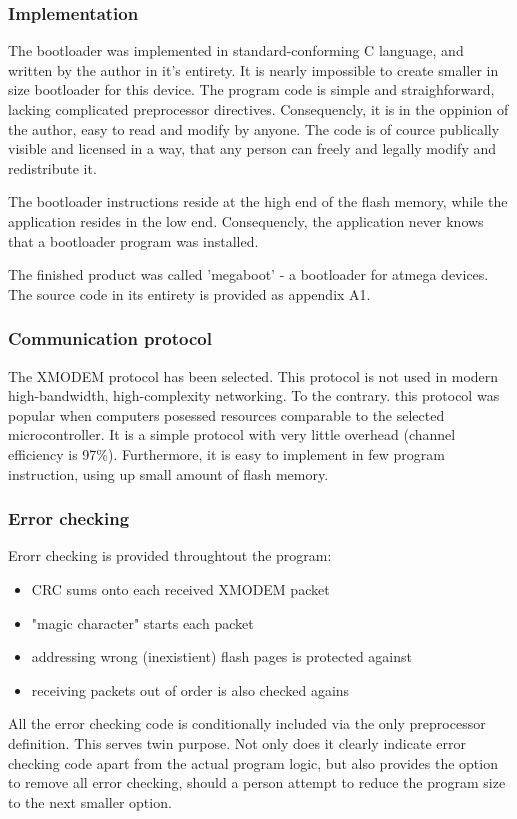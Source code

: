 \subsubsection{Implementation}
The bootloader was implemented in standard-conforming C language, and written by the author in it's entirety.
It is nearly impossible to create smaller in size bootloader for this device.
The program code is simple and straighforward, lacking complicated preprocessor directives.
Consequencly, it is in the oppinion of the author, easy to read and modify by anyone.
The code is of cource publically visible and licensed in a way, that any person can freely and legally modify and redistribute it.
\par
The bootloader instructions reside at the high end of the flash memory, while the application resides in the low end.
Consequencly, the application never knows that a bootloader program was installed.
\par
The finished product was called 'megaboot' - a bootloader for atmega devices.
The source code in its entirety is provided as appendix A1.

\subsubsection{Communication protocol}
The XMODEM protocol has been selected.
This protocol is not used in modern high-bandwidth, high-complexity networking.
To the contrary. this protocol was popular when computers posessed resources comparable to the selected microcontroller.
It is a simple protocol with very little overhead (channel efficiency is 97\%).
Furthermore, it is easy to implement in few program instruction, using up small amount of flash memory.

\subsubsection{Error checking}
Erorr checking is provided throughtout the program:
\begin{itemize}
\item{CRC sums onto each received XMODEM packet}
\item{"magic character" starts each packet}
\item{addressing wrong (inexistient) flash pages is protected against}
\item{receiving packets out of order is also checked agains}
\end{itemize}
All the error checking code is conditionally included via the only preprocessor definition.
This serves twin purpose.
Not only does it clearly indicate error checking code apart from the actual program logic, but also provides the option to remove all error checking, should a person attempt to reduce the program size to the next smaller option.

